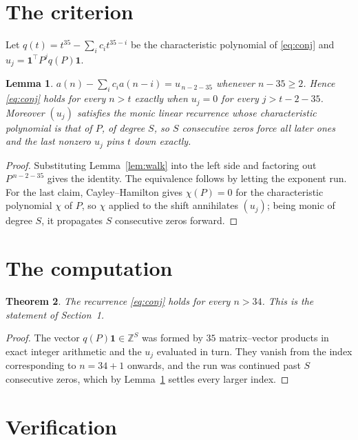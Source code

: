 \documentclass[11pt,a4paper]{article}
\theoremstyle{plain}
\newtheorem{theorem}{Theorem}
\newtheorem{lemma}[theorem]{Lemma}
\theoremstyle{definition}
\begin{document}
\section{The criterion}

Let $q(t)=t^{35}-\sum_i c_i t^{35-i}$ be the characteristic polynomial of
\eqref{eq:conj} and $u_j=\mathbf{1}^{\!\top}P^{j}q(P)\mathbf{1}$.

\begin{lemma}\label{lem:crit}
$a(n)-\sum_i c_i a(n-i)=u_{\,n-2-35}$ whenever $n-35\ge2$. Hence
\eqref{eq:conj} holds for every $n>t$ exactly when $u_j=0$ for every
$j>t-2-35$. Moreover $(u_j)$ satisfies the monic linear recurrence whose
characteristic polynomial is that of $P$, of degree $S$, so $S$ consecutive zeros force all
later ones and the last nonzero $u_j$ pins $t$ down exactly.
\end{lemma}

\begin{proof}
Substituting Lemma~\ref{lem:walk} into the left side and factoring out
$P^{\,n-2-35}$ gives the identity. The equivalence follows by letting the exponent
run. For the last claim, Cayley--Hamilton gives $\chi(P)=0$ for the characteristic
polynomial $\chi$ of $P$, so $\chi$ applied to the shift annihilates $(u_j)$; being monic of
degree $S$, it propagates $S$ consecutive zeros forward.
\end{proof}

\section{The computation}

\begin{theorem}
The recurrence \eqref{eq:conj} holds for every $n>34$. This is the statement of
Section~1.
\end{theorem}

\begin{proof}
The vector $q(P)\mathbf{1}\in\mathbb{Z}^{S}$ was formed by $35$ matrix--vector
products in exact integer arithmetic and the $u_j$ evaluated in turn. They vanish from the
index corresponding to $n=34+1$ onwards, and the run was continued past $S$ consecutive
zeros, which by Lemma~\ref{lem:crit} settles every larger index.
\end{proof}

\section{Verification}
\end{document}
